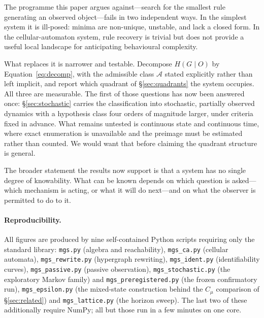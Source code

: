 \documentclass[11pt]{article}
\begin{document}
The programme this paper argues against---search for the smallest rule generating an
observed object---fails in two independent ways. In the simplest system it is
ill-posed: minima are non-unique, unstable, and lack a closed form. In the cellular-automaton
system, rule recovery is trivial but does not provide a useful local landscape for
anticipating behavioural complexity.

What replaces it is narrower and testable. Decompose $H(G\mid O)$ by
Equation~\eqref{eq:decomp}, with the admissible class $\mathcal{A}$ stated explicitly
rather than left implicit, and report which quadrant of \S\ref{sec:quadrants} the system occupies. All
three are measurable. The first of those questions has now been answered
once: \S\ref{sec:stochastic} carries the classification into stochastic, partially
observed dynamics with a hypothesis class four orders of magnitude larger, under criteria
fixed in advance. What remains untested is continuous state and continuous time, where
exact enumeration is unavailable and the preimage must be estimated rather than counted.
We would want that before claiming the quadrant structure is general.

The broader statement the results now support is that a system has no single degree of
knowability. What can be known depends on which question is asked---which mechanism is
acting, or what it will do next---and on what the observer is permitted to do to it.

\paragraph{Reproducibility.}
All figures are produced by nine self-contained Python scripts requiring only the
standard library: \texttt{mgs.py} (algebra and reachability), \texttt{mgs\_ca.py}
(cellular automata), \texttt{mgs\_rewrite.py} (hypergraph rewriting),
\texttt{mgs\_ident.py} (identifiability curves), \texttt{mgs\_passive.py} (passive
observation), \texttt{mgs\_stochastic.py} (the exploratory Markov family) and
\texttt{mgs\_preregistered.py} (the frozen confirmatory run),
\texttt{mgs\_epsilon.py} (the mixed-state construction behind the $C_\mu$ comparison of
\S\ref{sec:related}) and \texttt{mgs\_lattice.py} (the horizon sweep). The last two of
these additionally require NumPy; all but those run in a few minutes on one core.
\end{document}
